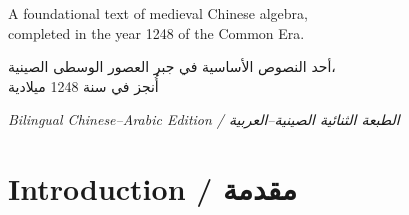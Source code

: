 \documentclass[11pt,a4paper]{article}
\newcommand{\ar}[1]{\arabicfont\beginR #1\endR}
\begin{document}
\begin{titlepage}
\vspace{1.2cm}

{\small
A foundational text of medieval Chinese algebra,\\
completed in the year 1248 of the Common Era.
}

\vspace{0.3cm}

{\small\color{notecolor}
\ar{أحد النصوص الأساسية في جبر العصور الوسطى الصينية،\\
أُنجز في سنة 1248 ميلادية}}

\vfill

{\small
\textit{Bilingual Chinese–Arabic Edition / \ar{الطبعة الثنائية الصينية–العربية}}
}

\end{titlepage}

\tableofcontents
\newpage

\section{Introduction / \ar{مقدمة}}
\label{sec:intro}
\end{document}
